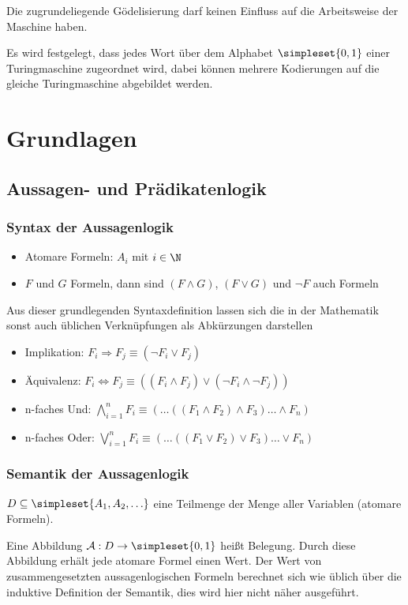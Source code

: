 Die zugrundeliegende Gödelisierung darf keinen Einfluss auf die Arbeitsweise der Maschine haben.

Es wird festgelegt, dass jedes Wort über dem Alphabet $\simpleset{0,1}$ einer Turingmaschine zugeordnet wird, dabei können mehrere Kodierungen auf die gleiche Turingmaschine abgebildet werden.


\chapter{Grundlagen}
\section{Aussagen- und Prädikatenlogik}
\subsection{Syntax der Aussagenlogik}
\begin{itemize}
	\item Atomare Formeln: $A_i$ mit $i\in\N$
	\item $F$ und $G$ Formeln, dann sind $(F\wedge G)$, $(F\vee G)$ und $\neg F$ auch Formeln
\end{itemize}

Aus dieser grundlegenden Syntaxdefinition lassen sich die in der Mathematik sonst auch üblichen Verknüpfungen als Abkürzungen darstellen
\begin{itemize}
	\item Implikation: $F_i\Rightarrow F_j \equiv (\neg F_i\vee F_j)$
	\item Äquivalenz: $F_i\Leftrightarrow F_j \equiv ((F_i\wedge F_j)\vee(\neg F_i\wedge \neg F_j))$
	\item n-faches Und: $\bigwedge\limits_{i=1}^n F_i \equiv (\ldots((F_1\wedge F_2)\wedge F_3)\ldots \wedge F_n)$
	\item n-faches Oder: $\bigvee\limits_{i=1}^n F_i \equiv (\ldots((F_1\vee F_2)\vee F_3)\ldots \vee F_n)$
\end{itemize}

\subsection{Semantik der Aussagenlogik}
$D\subseteq\simpleset{A_1,A_2,\ldots}$ eine Teilmenge der Menge aller Variablen (atomare Formeln).

Eine Abbildung $\mathcal A:D\rightarrow\simpleset{0,1}$ heißt Belegung. Durch diese Abbildung erhält jede atomare Formel einen Wert. Der Wert von zusammengesetzten aussagenlogischen Formeln berechnet sich wie üblich über die induktive Definition der Semantik, dies wird hier nicht näher ausgeführt.


